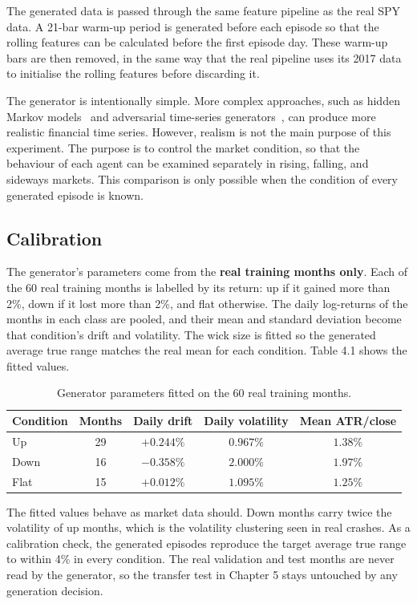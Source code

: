 The generated data is passed through the same feature pipeline as the
real SPY data. A 21-bar warm-up period is generated before each episode
so that the rolling features can be calculated before the first episode
day. These warm-up bars are then removed, in the same way that the real
pipeline uses its 2017 data to initialise the rolling features before
discarding it.

The generator is intentionally simple. More complex approaches, such as
hidden Markov models~\cite{rabiner1989} and adversarial time-series
generators~\cite{yoon2019timegan}, can produce more realistic financial
time series. However, realism is not the main purpose of this
experiment. The purpose is to control the market condition, so that the
behaviour of each agent can be examined separately in rising, falling,
and sideways markets. This comparison is only possible when the
condition of every generated episode is known.

\subsection{Calibration}

The generator's parameters come from the \textbf{real training months
only}. Each of the 60 real training months is labelled by its return:
up if it gained more than 2\%, down if it lost more than 2\%, and flat
otherwise. The daily log-returns of the months in each class are pooled,
and their mean and standard deviation become that condition's drift and
volatility. The wick size is fitted so the generated average true range
matches the real mean for each condition. Table 4.1 shows the fitted values.

\begin{table}[!htb]
\centering
\caption{Generator parameters fitted on the 60 real training months.}
\begin{tabular}{lcccc}
\toprule
\textbf{Condition} & \textbf{Months} & \textbf{Daily drift} &
\textbf{Daily volatility} & \textbf{Mean ATR/close} \\
\midrule
Up   & 29 & \(+0.244\%\) & \(0.967\%\) & \(1.38\%\) \\
Down & 16 & \(-0.358\%\) & \(2.000\%\) & \(1.97\%\) \\
Flat & 15 & \(+0.012\%\) & \(1.095\%\) & \(1.25\%\) \\
\bottomrule
\end{tabular}
\end{table}

The fitted values behave as market data should. Down months carry twice
the volatility of up months, which is the volatility clustering seen in
real crashes. As a calibration check, the generated episodes reproduce
the target average true range to within 4\% in every condition. The real
validation and test months are never read by the generator, so the
transfer test in Chapter 5 stays untouched by any generation decision.

